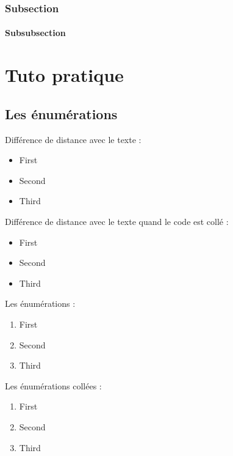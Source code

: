 \documentclass[a4paper,11pt]{report}    %
\begin{document}
\subsection{Subsection}

\blindtext

\subsubsection{Subsubsection}

\blindtext

\chapter{Tuto pratique}

\section{Les énumérations}

Différence de distance avec le texte :

\begin{itemize}
	\item First
	\item Second
	\item Third
\end{itemize}

Différence de distance avec le texte quand le code est collé :
\begin{itemize}
	\item First
	\item Second
	\item Third
\end{itemize}\bigskip	%

Les énumérations :

\begin{enumerate}
	\item First
	\item Second
	\item Third
\end{enumerate}

Les énumérations collées :
\begin{enumerate}
	\item First
	\item Second
	\item Third
\end{enumerate}

\newpage
\end{document}
